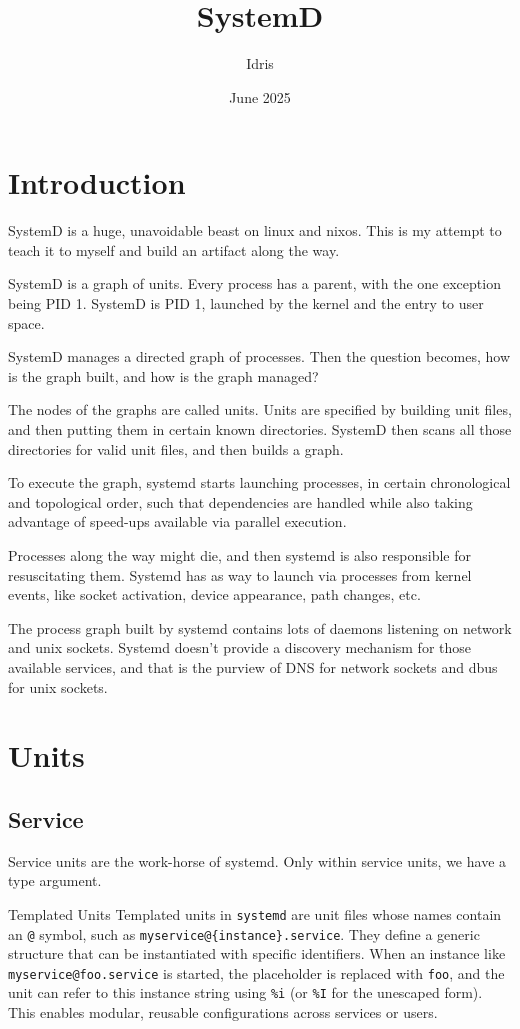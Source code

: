 \documentclass[openany, 12pt]{book}
\title{SystemD}
\author{Idris}
\date{June 2025}
\begin{document}
\tableofcontents

\frontmatter
\chapter{Introduction}
SystemD is a huge, unavoidable beast on linux and nixos. This is my attempt to
teach it to myself and build an artifact along the way.

SystemD is a graph of units.  Every process has a parent, with the one
exception being PID 1.  SystemD is PID 1, launched by the kernel and the entry
to user space.

SystemD manages a directed graph of processes.  Then the question becomes, how
is the graph built, and how is the graph managed?

The nodes of the graphs are called units.  Units are specified by building unit
files, and then putting them in certain known directories.  SystemD then scans
all those directories for valid unit files, and then builds a graph.

To execute the graph, systemd starts launching processes, in certain
chronological and topological order, such that dependencies are handled while
also taking advantage of speed-ups available via parallel execution.

Processes along the way might die, and then systemd is also responsible for
resuscitating them.  Systemd has as way to launch via processes from kernel
events, like socket activation, device appearance, path changes, etc.

The process graph built by systemd contains lots of daemons listening on network
and unix sockets. Systemd doesn't provide a discovery mechanism for those
available services, and that is the purview of DNS for network sockets and dbus
for unix sockets.

\mainmatter
\chapter{Units}
\section{Service}
Service units are the work-horse of systemd. Only within service units, we have
a type argument.

\begin{definition}{Templated Units}{}
  Templated units in \texttt{systemd} are unit files whose names contain an
  \texttt{@} symbol, such as \texttt{myservice@\{instance\}.service}. They define
  a generic structure that can be instantiated with specific identifiers. When an
  instance like \texttt{myservice@foo.service} is started, the placeholder is
  replaced with \texttt{foo}, and the unit can refer to this instance string using
  \texttt{\%i} (or \texttt{\%I} for the unescaped form). This enables modular,
  reusable configurations across services or users.
\end{definition}
\end{document}
